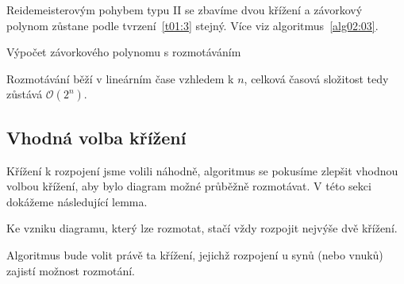 Reidemeisterovým pohybem typu II se zbavíme dvou křížení a závorkový polynom zůstane podle tvrzení~\ref{t01:3} stejný. Více viz algoritmus~\ref{alg02:03}.



\begin{algorithm}[p]
\caption{Výpočet závorkového polynomu s rozmotáváním} 
\label{alg02:03}
\DontPrintSemicolon

%





\end{algorithm}

Rozmotávání běží v lineárním čase vzhledem k $n$, celková časová složitost tedy zůstává $\mathcal{O}(2^n)$.

\subsection{Vhodná volba křížení} \label{volba}
Křížení k rozpojení jsme volili náhodně, algoritmus se pokusíme zlepšit vhodnou volbou křížení, aby bylo diagram možné průběžně rozmotávat.
V této sekci dokážeme následující lemma.
\begin{lemma} \label{volbalemma}
Ke vzniku diagramu, který lze rozmotat, stačí vždy rozpojit nejvýše dvě křížení.
\end{lemma}
Algoritmus bude volit právě ta křížení, jejichž rozpojení u synů (nebo vnuků) zajistí možnost rozmotání.

